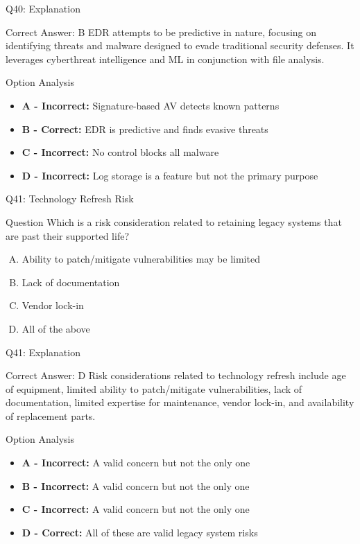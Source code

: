 \documentclass{beamer}
\begin{document}
	\begin{frame}{Q40: Explanation}
		\begin{block}{Correct Answer: B}
			EDR attempts to be predictive in nature, focusing on identifying threats and malware designed to evade traditional security defenses. It leverages cyberthreat intelligence and ML in conjunction with file analysis.
		\end{block}
		\begin{block}{Option Analysis}
			\begin{itemize}
				\item \textbf{A - Incorrect:} Signature-based AV detects known patterns
				\item \textbf{B - Correct:} EDR is predictive and finds evasive threats
				\item \textbf{C - Incorrect:} No control blocks all malware
				\item \textbf{D - Incorrect:} Log storage is a feature but not the primary purpose
			\end{itemize}
		\end{block}
	\end{frame}
	
	\begin{frame}{Q41: Technology Refresh Risk}
		\begin{block}{Question}
			Which is a risk consideration related to retaining legacy systems that are past their supported life?
		\end{block}
		\begin{enumerate}[(A)]
			\item Ability to patch/mitigate vulnerabilities may be limited
			\item Lack of documentation
			\item Vendor lock-in
			\item All of the above
		\end{enumerate}
	\end{frame}
	
	\begin{frame}{Q41: Explanation}
		\begin{block}{Correct Answer: D}
			Risk considerations related to technology refresh include age of equipment, limited ability to patch/mitigate vulnerabilities, lack of documentation, limited expertise for maintenance, vendor lock-in, and availability of replacement parts.
		\end{block}
		\begin{block}{Option Analysis}
			\begin{itemize}
				\item \textbf{A - Incorrect:} A valid concern but not the only one
				\item \textbf{B - Incorrect:} A valid concern but not the only one
				\item \textbf{C - Incorrect:} A valid concern but not the only one
				\item \textbf{D - Correct:} All of these are valid legacy system risks
			\end{itemize}
		\end{block}
	\end{frame}
	
\end{document}
